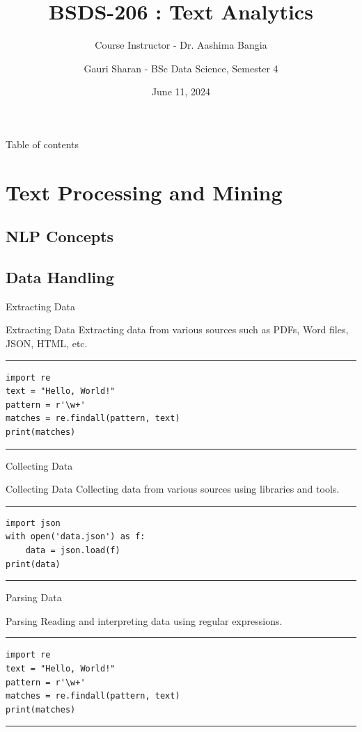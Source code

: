 \documentclass[aspectratio=169, hideothersubsections]{beamer}
\title{BSDS-206 : Text Analytics}
\subtitle{Course Instructor - Dr. Aashima Bangia}
\author[Gauri Sharan]{Gauri Sharan - BSc Data Science, Semester 4}
\date{June 11, 2024}
\begin{document}
\frame{\titlepage}

\begin{frame}{Table of contents}
    \tableofcontents[hideallsubsections]
\end{frame}

\section{Text Processing and Mining}

\subsection{NLP Concepts}

\subsection{Data Handling}

\begin{frame}[fragile]{Extracting Data}
\begin{block}{Extracting Data}
    Extracting data from various sources such as PDFs, Word files, JSON, HTML, etc.
  \end{block}
\rule{\textwidth}{1pt}
\scriptsize
\begin{verbatim}
import re
text = "Hello, World!"
pattern = r'\w+'
matches = re.findall(pattern, text)
print(matches)
\end{verbatim}
\rule{\textwidth}{1pt}
\end{frame}

\begin{frame}[fragile]{Collecting Data}
\begin{block}{Collecting Data}
    Collecting data from various sources using libraries and tools.
  \end{block}
\rule{\textwidth}{1pt}
\scriptsize
\begin{verbatim}
import json
with open('data.json') as f:
    data = json.load(f)
print(data)
\end{verbatim}
\rule{\textwidth}{1pt}
\end{frame}

\begin{frame}[fragile]{Parsing Data}
\begin{block}{Parsing}
    Reading and interpreting data using regular expressions.
  \end{block}
\rule{\textwidth}{1pt}
\scriptsize
\begin{verbatim}
import re
text = "Hello, World!"
pattern = r'\w+'
matches = re.findall(pattern, text)
print(matches)
\end{verbatim}
\rule{\textwidth}{1pt}
\end{frame}
\end{document}
